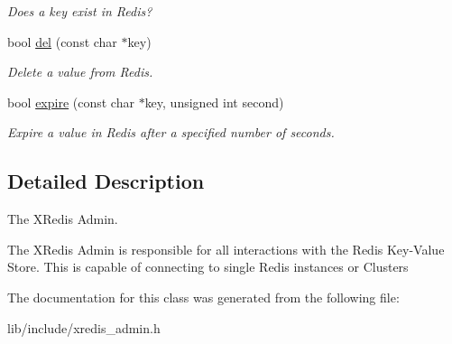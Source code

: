 \begin{DoxyCompactItemize}
\begin{DoxyCompactList}\small\item\em Does a key exist in Redis? \end{DoxyCompactList}\item 
\hypertarget{classxRedisAdmin_aec6bb15ec6d7764423e6abddac9a7c3c}{bool \hyperlink{classxRedisAdmin_aec6bb15ec6d7764423e6abddac9a7c3c}{del} (const char $\ast$key)}\label{classxRedisAdmin_aec6bb15ec6d7764423e6abddac9a7c3c}

\begin{DoxyCompactList}\small\item\em Delete a value from Redis. \end{DoxyCompactList}\item 
\hypertarget{classxRedisAdmin_a97cac4467038a8b4309029ed13563ff2}{bool \hyperlink{classxRedisAdmin_a97cac4467038a8b4309029ed13563ff2}{expire} (const char $\ast$key, unsigned int second)}\label{classxRedisAdmin_a97cac4467038a8b4309029ed13563ff2}

\begin{DoxyCompactList}\small\item\em Expire a value in Redis after a specified number of seconds. \end{DoxyCompactList}\end{DoxyCompactItemize}


\subsection{Detailed Description}
The X\-Redis Admin. 

The X\-Redis Admin is responsible for all interactions with the Redis Key-\/\-Value Store. This is capable of connecting to single Redis instances or Clusters 

The documentation for this class was generated from the following file\-:\begin{DoxyCompactItemize}
\item 
lib/include/xredis\-\_\-admin.\-h\end{DoxyCompactItemize}
